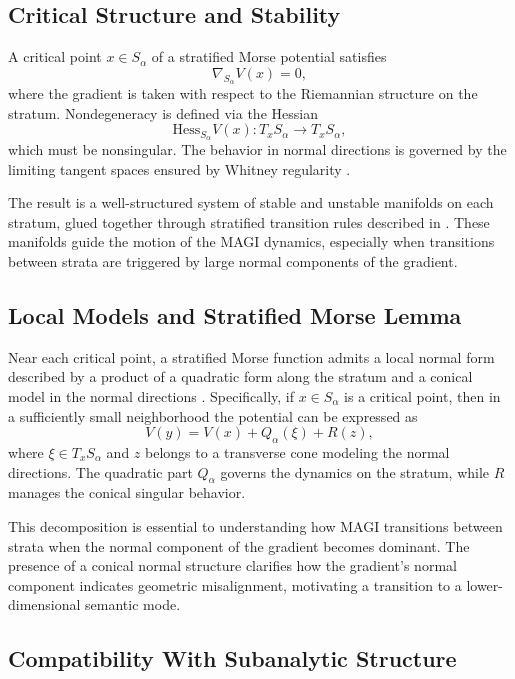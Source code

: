 \documentclass[12pt]{article}
\begin{document}
\subsection*{Critical Structure and Stability}

A critical point $x \in S_\alpha$ of a stratified Morse potential satisfies
\[
\nabla_{S_\alpha} V(x) = 0,
\]
where the gradient is taken with respect to the Riemannian structure on the stratum. Nondegeneracy is defined via the Hessian
\[
\mathrm{Hess}_{S_\alpha} V(x) : T_x S_\alpha \to T_x S_\alpha,
\]
which must be nonsingular. The behavior in normal directions is governed by the limiting tangent spaces ensured by Whitney regularity \citep{Whitney1965,Mather1973}.

The result is a well-structured system of stable and unstable manifolds on each stratum, glued together through stratified transition rules described in \cite{GoreskyMacPherson1988}. These manifolds guide the motion of the MAGI dynamics, especially when transitions between strata are triggered by large normal components of the gradient.

\subsection*{Local Models and Stratified Morse Lemma}

Near each critical point, a stratified Morse function admits a local normal form described by a product of a quadratic form along the stratum and a conical model in the normal directions \citep{GoreskyMacPherson1988,Pflaum2000}. Specifically, if $x \in S_\alpha$ is a critical point, then in a sufficiently small neighborhood the potential can be expressed as
\[
V(y) = V(x)
+ Q_{\alpha}(\xi)
+ R(z),
\]
where $\xi \in T_xS_\alpha$ and $z$ belongs to a transverse cone modeling the normal directions. The quadratic part $Q_\alpha$ governs the dynamics on the stratum, while $R$ manages the conical singular behavior.

This decomposition is essential to understanding how MAGI transitions between strata when the normal component of the gradient becomes dominant. The presence of a conical normal structure clarifies how the gradient’s normal component indicates geometric misalignment, motivating a transition to a lower-dimensional semantic mode.

\subsection*{Compatibility With Subanalytic Structure}
\end{document}
